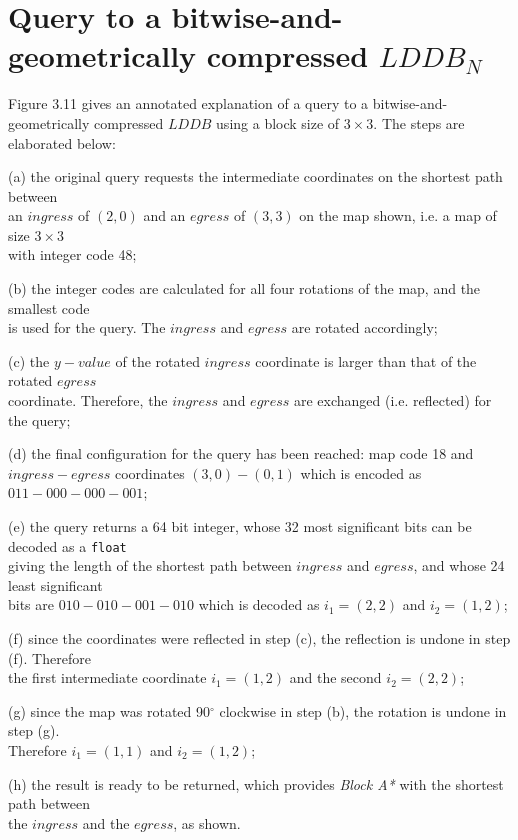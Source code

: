 \section{Query to a bitwise-and-geometrically compressed $LDDB_{N}$}

Figure 3.11 gives an annotated explanation of a query to a bitwise-and-geometrically compressed $LDDB$ using a block size of $3 \times 3$. The steps are elaborated below:

\begin{description}
\item(a) the original query requests the intermediate coordinates on the shortest path between \\ an $ingress$ of $(2,0)$ and an $egress$ of $(3,3)$ on the map shown, i.e. a map of size $3 \times 3$ \\ with integer code 48;
    
\item (b) the integer codes are calculated for all four rotations of the map, and the smallest code \\ is used for the query. The $ingress$ and $egress$ are rotated accordingly;
    
\item (c) the $y-value$ of the rotated $ingress$ coordinate is larger than that of the rotated $egress$ \\ coordinate. Therefore, the $ingress$ and $egress$ are exchanged (i.e. reflected) for the query;
    
\item (d) the final configuration for the query has been reached: map code 18 and \\ $ingress-egress$ coordinates $(3,0)-(0,1)$ which is encoded as $011-000-000-001$;
    
\item (e) the query returns a 64 bit integer, whose 32 most significant bits can be decoded as a {\tt float} \\ giving the length of the shortest path between $ingress$ and $egress$, and whose 24 least significant \\ bits are $010-010-001-010$ which is decoded as $i_{1}=(2,2)$ and $i_{2}=(1,2)$;
    
\item (f) since the coordinates were reflected in step (c), the reflection is undone in step (f). Therefore \\ the first intermediate coordinate $i_{1}=(1,2)$ and the second $i_{2}=(2,2)$;
    
\item (g) since the map was rotated 90$^{\circ}$ clockwise in step (b), the rotation is undone in step (g). \\ Therefore $i_{1}=(1,1)$ and $i_{2}=(1,2)$;
    
\item (h) the result is ready to be returned, which provides {\em Block A*} with the shortest path between \\ the $ingress$ and the $egress$, as shown.
\end{description}

